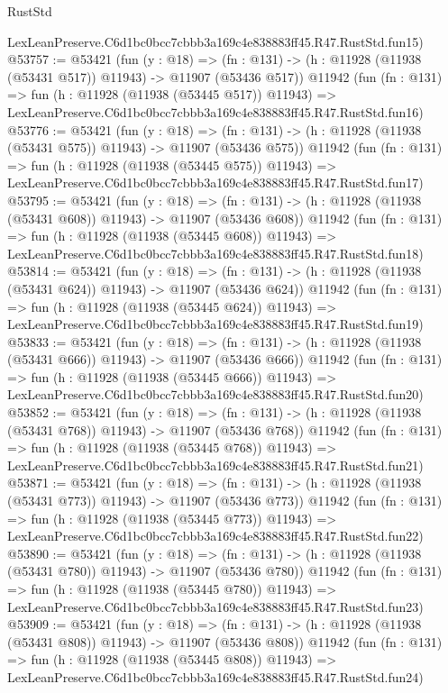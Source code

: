 \begin{lexlean}{RustStd}
\begin{coremodule}
    LexLeanPreserve.C6d1bc0bcc7cbbb3a169c4e838883ff45.R47.RustStd.fun15)
@53757 := @53421
    (fun (y : @18) =>
    (fn : @131) -> (h : @11928 (@11938 (@53431 @517)) @11943) -> @11907 (@53436 @517))
    @11942
    (fun (fn : @131) =>
    fun (h : @11928 (@11938 (@53445 @517)) @11943) =>
    LexLeanPreserve.C6d1bc0bcc7cbbb3a169c4e838883ff45.R47.RustStd.fun16)
@53776 := @53421
    (fun (y : @18) =>
    (fn : @131) -> (h : @11928 (@11938 (@53431 @575)) @11943) -> @11907 (@53436 @575))
    @11942
    (fun (fn : @131) =>
    fun (h : @11928 (@11938 (@53445 @575)) @11943) =>
    LexLeanPreserve.C6d1bc0bcc7cbbb3a169c4e838883ff45.R47.RustStd.fun17)
@53795 := @53421
    (fun (y : @18) =>
    (fn : @131) -> (h : @11928 (@11938 (@53431 @608)) @11943) -> @11907 (@53436 @608))
    @11942
    (fun (fn : @131) =>
    fun (h : @11928 (@11938 (@53445 @608)) @11943) =>
    LexLeanPreserve.C6d1bc0bcc7cbbb3a169c4e838883ff45.R47.RustStd.fun18)
@53814 := @53421
    (fun (y : @18) =>
    (fn : @131) -> (h : @11928 (@11938 (@53431 @624)) @11943) -> @11907 (@53436 @624))
    @11942
    (fun (fn : @131) =>
    fun (h : @11928 (@11938 (@53445 @624)) @11943) =>
    LexLeanPreserve.C6d1bc0bcc7cbbb3a169c4e838883ff45.R47.RustStd.fun19)
@53833 := @53421
    (fun (y : @18) =>
    (fn : @131) -> (h : @11928 (@11938 (@53431 @666)) @11943) -> @11907 (@53436 @666))
    @11942
    (fun (fn : @131) =>
    fun (h : @11928 (@11938 (@53445 @666)) @11943) =>
    LexLeanPreserve.C6d1bc0bcc7cbbb3a169c4e838883ff45.R47.RustStd.fun20)
@53852 := @53421
    (fun (y : @18) =>
    (fn : @131) -> (h : @11928 (@11938 (@53431 @768)) @11943) -> @11907 (@53436 @768))
    @11942
    (fun (fn : @131) =>
    fun (h : @11928 (@11938 (@53445 @768)) @11943) =>
    LexLeanPreserve.C6d1bc0bcc7cbbb3a169c4e838883ff45.R47.RustStd.fun21)
@53871 := @53421
    (fun (y : @18) =>
    (fn : @131) -> (h : @11928 (@11938 (@53431 @773)) @11943) -> @11907 (@53436 @773))
    @11942
    (fun (fn : @131) =>
    fun (h : @11928 (@11938 (@53445 @773)) @11943) =>
    LexLeanPreserve.C6d1bc0bcc7cbbb3a169c4e838883ff45.R47.RustStd.fun22)
@53890 := @53421
    (fun (y : @18) =>
    (fn : @131) -> (h : @11928 (@11938 (@53431 @780)) @11943) -> @11907 (@53436 @780))
    @11942
    (fun (fn : @131) =>
    fun (h : @11928 (@11938 (@53445 @780)) @11943) =>
    LexLeanPreserve.C6d1bc0bcc7cbbb3a169c4e838883ff45.R47.RustStd.fun23)
@53909 := @53421
    (fun (y : @18) =>
    (fn : @131) -> (h : @11928 (@11938 (@53431 @808)) @11943) -> @11907 (@53436 @808))
    @11942
    (fun (fn : @131) =>
    fun (h : @11928 (@11938 (@53445 @808)) @11943) =>
    LexLeanPreserve.C6d1bc0bcc7cbbb3a169c4e838883ff45.R47.RustStd.fun24)

\end{coremodule}
\end{lexlean}
